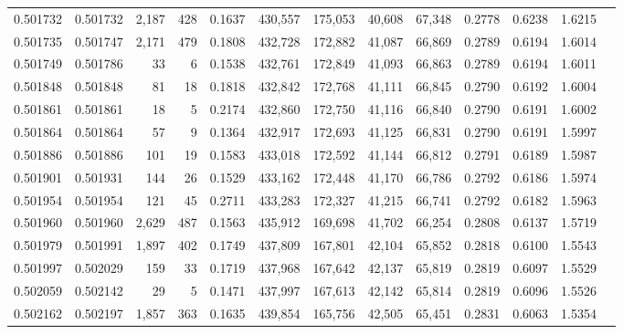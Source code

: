 \begin{tabular}{rrrrrrrrrrrrr}
0.501732 & 0.501732 & 2,187 &   428 &                                     0.1637 & 430,557 & 175,053 &  40,608 &  67,348 & 0.2778 & 0.6238 & 1.6215 \\
0.501735 & 0.501747 & 2,171 &   479 &                                     0.1808 & 432,728 & 172,882 &  41,087 &  66,869 & 0.2789 & 0.6194 & 1.6014 \\
0.501749 & 0.501786 &    33 &     6 &                                     0.1538 & 432,761 & 172,849 &  41,093 &  66,863 & 0.2789 & 0.6194 & 1.6011 \\
0.501848 & 0.501848 &    81 &    18 &                                     0.1818 & 432,842 & 172,768 &  41,111 &  66,845 & 0.2790 & 0.6192 & 1.6004 \\
0.501861 & 0.501861 &    18 &     5 &                                     0.2174 & 432,860 & 172,750 &  41,116 &  66,840 & 0.2790 & 0.6191 & 1.6002 \\
0.501864 & 0.501864 &    57 &     9 &                                     0.1364 & 432,917 & 172,693 &  41,125 &  66,831 & 0.2790 & 0.6191 & 1.5997 \\
0.501886 & 0.501886 &   101 &    19 &                                     0.1583 & 433,018 & 172,592 &  41,144 &  66,812 & 0.2791 & 0.6189 & 1.5987 \\
0.501901 & 0.501931 &   144 &    26 &                                     0.1529 & 433,162 & 172,448 &  41,170 &  66,786 & 0.2792 & 0.6186 & 1.5974 \\
0.501954 & 0.501954 &   121 &    45 &                                     0.2711 & 433,283 & 172,327 &  41,215 &  66,741 & 0.2792 & 0.6182 & 1.5963 \\
0.501960 & 0.501960 & 2,629 &   487 &                                     0.1563 & 435,912 & 169,698 &  41,702 &  66,254 & 0.2808 & 0.6137 & 1.5719 \\
0.501979 & 0.501991 & 1,897 &   402 &                                     0.1749 & 437,809 & 167,801 &  42,104 &  65,852 & 0.2818 & 0.6100 & 1.5543 \\
0.501997 & 0.502029 &   159 &    33 &                                     0.1719 & 437,968 & 167,642 &  42,137 &  65,819 & 0.2819 & 0.6097 & 1.5529 \\
0.502059 & 0.502142 &    29 &     5 &                                     0.1471 & 437,997 & 167,613 &  42,142 &  65,814 & 0.2819 & 0.6096 & 1.5526 \\
0.502162 & 0.502197 & 1,857 &   363 &                                     0.1635 & 439,854 & 165,756 &  42,505 &  65,451 & 0.2831 & 0.6063 & 1.5354 \\

\end{tabular}
